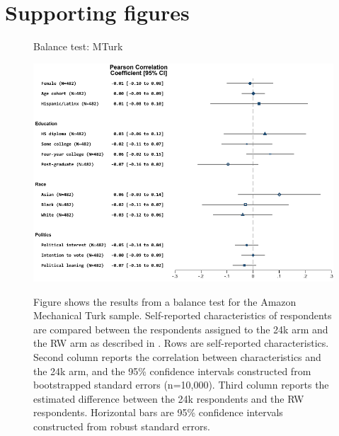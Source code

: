 \documentclass[12pt, letterpaper]{article}
\begin{document}
\section{Supporting figures}
\begin{center}
\begin{figure}[H]
  \centering
  \caption{Balance test: MTurk}
  \includegraphics[scale=.8]{../figs/baltest-24k-rw.pdf}
  \label{fig:baltest-24k-rw}
  \caption*{\footnotesize Figure shows the results from a balance test for the Amazon Mechanical Turk sample. Self-reported characteristics of respondents are compared between the respondents assigned to the 24k arm and the RW arm as described in . 
  Rows are self-reported characteristics.
  Second column reports the correlation between characteristics and the 24k arm, and the 95\% confidence intervals constructed from bootstrapped standard errors (n=10,000).
  Third column reports the estimated difference between the 24k respondents and the RW respondents.
  Horizontal bars are 95\% confidence intervals constructed from robust standard errors.
  }
\end{figure}
\end{center}
\end{document}
